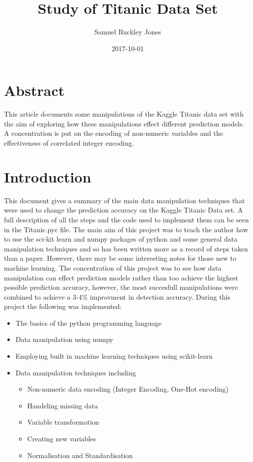 \documentclass{article}
\title{Study of Titanic Data Set}
\date{2017-10-01}
\author{Samuel Ruckley Jones}
\begin{document}
\maketitle
\newpage
{}

\section{Abstract}
This article documents some  manipulations of the Kaggle Titanic data set with the aim of exploring how these manipulations effect different prediction models. A concentration is put on the encoding of non-numeric variables and the effectiveness of correlated integer encoding. 
\newpage
\section{Introduction}

This document gives a summary of the main data manipulation techniques that were used to change the prediction accuracy on the Kaggle Titanic Data set. A full description of all the steps and the code used to implement them can be seen in the Titanic.pyc file. The main aim of this project was to teach the author how to use the sci-kit learn and numpy packages of python and some general data manipulation techniques and so has been written more as a record of steps taken than a paper. However, there may be some interesting notes for those new to machine learning. The concentration of this project was to see how data manipulation can effect prediction models rather than too achieve the highest possible prediction accuracy, however, the most succesfull manipulations were combined to achieve a 3-4\% improvment in detection accuracy.
\linebreak
\linebreak
During this project the following was implemented:

\begin{itemize}
\item The basics of the python programming language
\item Data manipulation using numpy
\item Employing built in machine learning techniques using scikit-learn
\item Data manipulation techniques including
\begin{itemize}
\item Non-numeric data encoding (Integer Encoding, One-Hot encoding)
\item Handeling missing data
\item Variable transformation
\item Creating new variables
\item Normalisation and Standardisation
\end{itemize}
\end{itemize}
\end{document}
